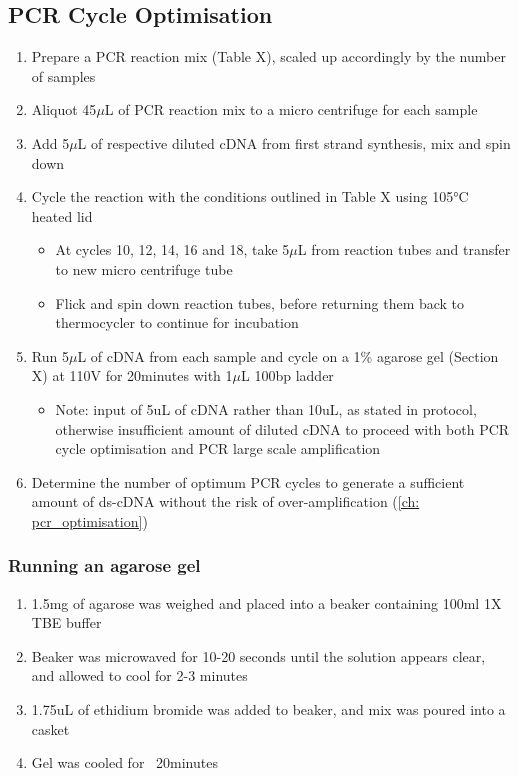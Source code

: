 \subsection{PCR Cycle Optimisation} 
\begin{enumerate}
	\item Prepare a PCR reaction mix (Table X), scaled up accordingly by the number of samples
	\item Aliquot 45$\mu$L of PCR reaction mix to a micro centrifuge for each sample 
	\item Add 5$\mu$L of respective diluted cDNA from first strand synthesis, mix and spin down 
	\item Cycle the reaction with the conditions outlined in Table X using 105°C heated lid
	\begin{itemize}
		\item At cycles 10, 12, 14, 16 and 18, take 5$\mu$L from reaction tubes and transfer to new micro centrifuge tube
		\item Flick and spin down reaction tubes, before returning them back to thermocycler to continue for incubation  
	\end{itemize}
	\item Run 5$\mu$L of cDNA from each sample and cycle on a 1\% agarose gel (Section X) at 110V for 20minutes with 1$\mu$L 100bp ladder
	\begin{itemize}
		\item Note: input of 5uL of cDNA rather than 10uL, as stated in protocol, otherwise insufficient amount of diluted cDNA to proceed with both PCR cycle optimisation and PCR large scale amplification
	\end{itemize} 
	\item Determine the number of optimum PCR cycles to generate a sufficient amount of ds-cDNA without the risk of over-amplification (\cref{ch: pcr_optimisation})
\end{enumerate} 
	
\subsubsection{Running an agarose gel}
\label{Isoseq_Protocol_running_agarose_gel}
\begin{enumerate}
	\item 1.5mg of agarose was weighed and placed into a beaker containing 100ml 1X TBE buffer 
	\item Beaker was microwaved for 10-20 seconds until the solution appears clear, and allowed to cool for 2-3 minutes 
	\item 1.75uL of ethidium bromide was added to beaker, and mix was poured into a casket 
	\item Gel was cooled for ~20minutes
\end{enumerate} 

